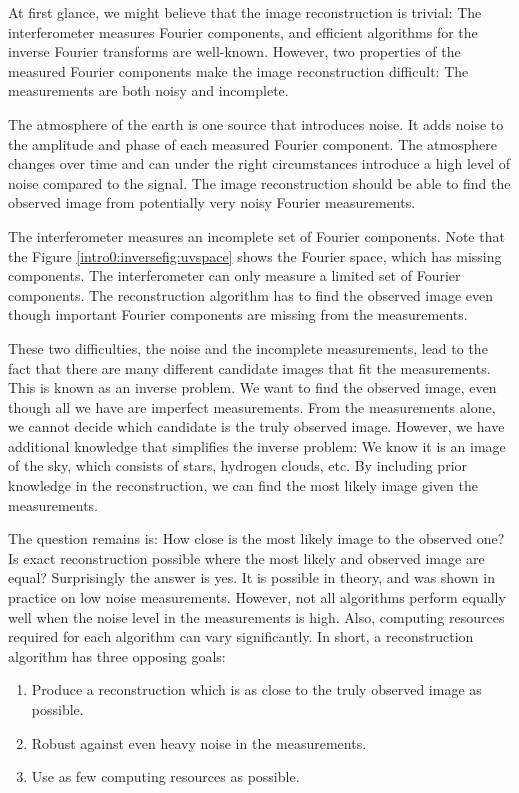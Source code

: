At first glance, we might believe that the image reconstruction is trivial: The interferometer measures Fourier components, and efficient algorithms for the inverse Fourier transforms are well-known. However, two properties of the measured Fourier components make the image reconstruction difficult: The measurements are both noisy and incomplete.

The atmosphere of the earth is one source that introduces noise. It adds noise to the amplitude and phase of each measured Fourier component. The atmosphere changes over time and can under the right circumstances introduce a high level of noise compared to the signal. The image reconstruction should be able to find the observed image from potentially very noisy Fourier measurements.

The interferometer measures an incomplete set of Fourier components. Note that the Figure \ref{intro0:inversefig:uvspace} shows the Fourier space, which has missing components. The interferometer can only measure a limited set of Fourier components. The reconstruction algorithm has to find the observed image even though important Fourier components are missing from the measurements.

These two difficulties, the noise and the incomplete measurements, lead to the fact that there are many different candidate images that fit the measurements.  This is known as an inverse problem. We want to find the observed image, even though all we have are imperfect measurements. From the measurements alone, we cannot decide which candidate is the truly observed image. However, we have additional knowledge that simplifies the inverse problem: We know it is an image of the sky, which consists of stars, hydrogen clouds, etc. By including prior knowledge in the reconstruction, we can find the most likely image given the measurements. 

The question remains is: How close is the most likely image to the observed one? Is exact reconstruction possible where the most likely and observed image are equal? Surprisingly the answer is yes. It is possible in theory\cite{candes2006robust,donoho2006compressed}, and was shown in practice on low noise measurements\cite{dabbech2018cygnus, dabbech2015moresane}. However, not all algorithms perform equally well when the noise level in the measurements is high. Also, computing resources required for each algorithm can vary significantly. In short, a reconstruction algorithm has three opposing goals:
\begin{enumerate}
	\item Produce a reconstruction which is as close to the truly observed image as possible.
	\item Robust against even heavy noise in the measurements.
	\item Use as few computing resources as possible.
\end{enumerate}

